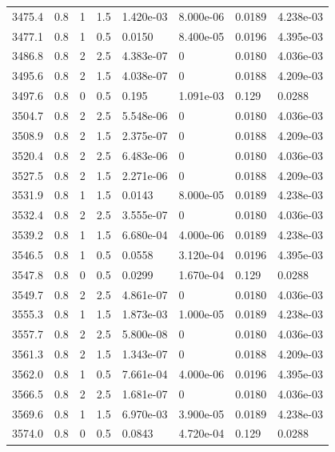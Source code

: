 \documentclass[preview]{standalone}
\begin{document}
{{{{{{{{{{{{{\begin{tabular}{L{1.2cm}C{1.2cm} C{0.3cm}C{0.5cm} C{1.4cm}C{1.4cm} C{1.4cm}C{1.4cm}}
  3475.4  &   0.8  & 1     & 1.5 &  1.420e-03  & 8.000e-06  & 0.0189 &  4.238e-03   \\ 
  3477.1  &   0.8  & 1     & 0.5 &  0.0150  & 8.400e-05  & 0.0196 &  4.395e-03   \\ 
  3486.8  &   0.8  & 2     & 2.5 &  4.383e-07  & 0  & 0.0180 &  4.036e-03   \\ 
  3495.6  &   0.8  & 2     & 1.5 &  4.038e-07  & 0  & 0.0188 &  4.209e-03   \\ 
  3497.6  &   0.8  & 0     & 0.5 &  0.195  & 1.091e-03  & 0.129 &  0.0288   \\ 
  3504.7  &   0.8  & 2     & 2.5 &  5.548e-06  & 0  & 0.0180 &  4.036e-03   \\ 
  3508.9  &   0.8  & 2     & 1.5 &  2.375e-07  & 0  & 0.0188 &  4.209e-03   \\ 
  3520.4  &   0.8  & 2     & 2.5 &  6.483e-06  & 0  & 0.0180 &  4.036e-03   \\ 
  3527.5  &   0.8  & 2     & 1.5 &  2.271e-06  & 0  & 0.0188 &  4.209e-03   \\ 
  3531.9  &   0.8  & 1     & 1.5 &  0.0143  & 8.000e-05  & 0.0189 &  4.238e-03   \\ 
  3532.4  &   0.8  & 2     & 2.5 &  3.555e-07  & 0  & 0.0180 &  4.036e-03   \\ 
  3539.2  &   0.8  & 1     & 1.5 &  6.680e-04  & 4.000e-06  & 0.0189 &  4.238e-03   \\ 
  3546.5  &   0.8  & 1     & 0.5 &  0.0558  & 3.120e-04  & 0.0196 &  4.395e-03   \\ 
  3547.8  &   0.8  & 0     & 0.5 &  0.0299  & 1.670e-04  & 0.129 &  0.0288   \\ 
  3549.7  &   0.8  & 2     & 2.5 &  4.861e-07  & 0  & 0.0180 &  4.036e-03   \\ 
  3555.3  &   0.8  & 1     & 1.5 &  1.873e-03  & 1.000e-05  & 0.0189 &  4.238e-03   \\ 
  3557.7  &   0.8  & 2     & 2.5 &  5.800e-08  & 0  & 0.0180 &  4.036e-03   \\ 
  3561.3  &   0.8  & 2     & 1.5 &  1.343e-07  & 0  & 0.0188 &  4.209e-03   \\ 
  3562.0  &   0.8  & 1     & 0.5 &  7.661e-04  & 4.000e-06  & 0.0196 &  4.395e-03   \\ 
  3566.5  &   0.8  & 2     & 2.5 &  1.681e-07  & 0  & 0.0180 &  4.036e-03   \\ 
  3569.6  &   0.8  & 1     & 1.5 &  6.970e-03  & 3.900e-05  & 0.0189 &  4.238e-03   \\ 
  3574.0  &   0.8  & 0     & 0.5 &  0.0843  & 4.720e-04  & 0.129 &  0.0288   \\ 

\end{tabular}}}}}}}}}}}}}}
\end{document}
